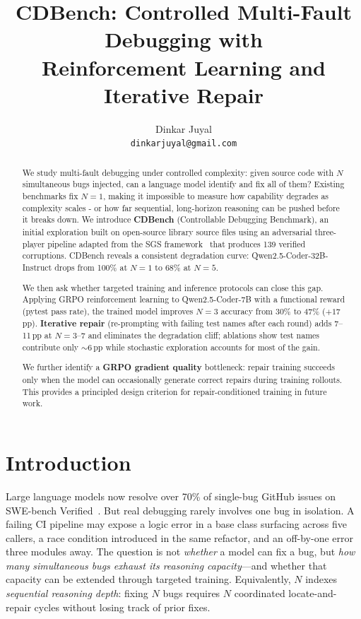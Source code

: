 \documentclass[12pt]{article}
\title{CDBench: Controlled Multi-Fault Debugging with\\Reinforcement Learning and Iterative Repair}
\author{
  Dinkar Juyal \\
  \texttt{dinkarjuyal@gmail.com}
}
\begin{document}
\maketitle

\begin{abstract}
We study multi-fault debugging under controlled complexity: given source code
with $N$ simultaneous bugs injected, can a language model identify and fix all
of them? Existing benchmarks fix $N{=}1$, making it impossible to measure how
capability degrades as complexity scales - or how far sequential, long-horizon
reasoning can be pushed before it breaks down. We introduce \textbf{CDBench} (Controllable Debugging Benchmark), an initial exploration built
on open-source library source files using an adversarial three-player pipeline
adapted from the SGS framework~\cite{sgs2025} that produces 139 verified
corruptions. CDBench reveals a consistent degradation curve:
Qwen2.5-Coder-32B-Instruct drops from 100\% at $N{=}1$ to 68\% at $N{=}5$.

We then ask whether targeted training and inference protocols can close this
gap. Applying GRPO reinforcement learning to Qwen2.5-Coder-7B with a
functional reward (pytest pass rate), the trained model improves $N{=}3$
accuracy from 30\% to 47\% ($+17$\,pp).
\textbf{Iterative repair} (re-prompting with failing test names after each
round) adds 7--11\,pp at $N{=}3$--7 and eliminates the degradation cliff;
ablations show test names contribute only ${\sim}6$\,pp while stochastic
exploration accounts for most of the gain.

We further identify a \textbf{GRPO gradient quality} bottleneck: repair
training succeeds only when the model can occasionally generate correct repairs
during training rollouts. This provides a principled design criterion for
repair-conditioned training in future work.
\end{abstract}

\section{Introduction}
\label{sec:intro}

Large language models now resolve over 70\% of single-bug GitHub issues on
SWE-bench Verified~\cite{jimenez2024swebench}. But real debugging rarely
involves one bug in isolation. A failing CI pipeline may expose a logic error
in a base class surfacing across five callers, a race condition introduced in
the same refactor, and an off-by-one error three modules away. The question is
not \emph{whether} a model can fix a bug, but \emph{how many simultaneous bugs
exhaust its reasoning capacity}---and whether that capacity can be extended
through targeted training. Equivalently, $N$ indexes \emph{sequential reasoning
depth}: fixing $N$ bugs requires $N$ coordinated locate-and-repair cycles without
losing track of prior fixes.
\end{document}

